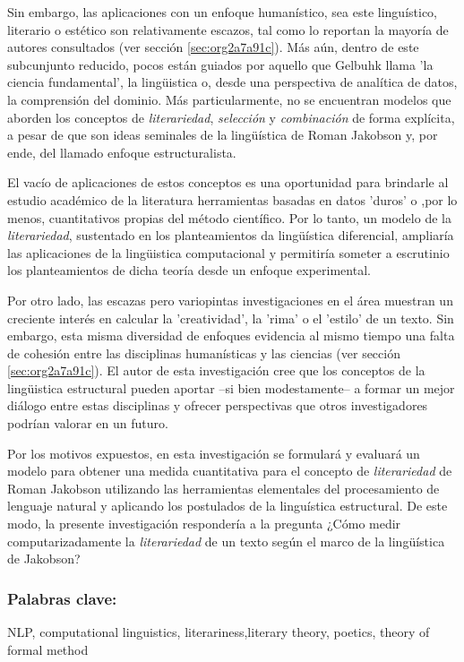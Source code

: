 \documentclass[12pt,letterpaper,twoside]{article}
\begin{document}
Sin embargo, las aplicaciones con un enfoque humanístico, sea este
linguístico, literario o estético son relativamente escazos, tal como
lo reportan la mayoría de autores consultados (ver sección \ref{sec:org2a7a91c}).  Más aún, dentro de este subcunjunto reducido, pocos
están guiados por aquello que Gelbuhk llama 'la ciencia fundamental',
la lingüistica o, desde una perspectiva de analítica de datos, la
comprensión del dominio. Más particularmente, no se encuentran modelos
que aborden los conceptos de \emph{literariedad}, \emph{selección} y \emph{combinación}
de forma explícita, a pesar de que son ideas seminales de la lingüística
de Roman Jakobson y, por ende, del llamado enfoque estructuralista.

El vacío de aplicaciones de estos conceptos es una oportunidad para
brindarle al estudio académico de la literatura herramientas basadas
en datos 'duros' o ,por lo menos, cuantitativos propias del método
científico. Por lo tanto, un modelo de la \emph{literariedad}, sustentado
en los planteamientos da lingüística diferencial, ampliaría las
aplicaciones de la lingüistica computacional y permitiría someter a
escrutinio los planteamientos de dicha teoría desde un enfoque
experimental.

Por otro lado, las escazas pero variopintas investigaciones en el área
muestran un creciente interés en calcular la 'creatividad', la 'rima'
o el 'estilo' de un texto. Sin embargo, esta misma diversidad de
enfoques evidencia al mismo tiempo una falta de cohesión entre las
disciplinas humanísticas y las ciencias (ver sección \ref{sec:org2a7a91c}). El autor de esta investigación cree que los conceptos de
la lingüistica estructural pueden aportar --si bien modestamente-- a
formar un mejor diálogo entre estas disciplinas y ofrecer perspectivas
que otros investigadores podrían valorar en un futuro.

Por los motivos expuestos, en esta investigación se formulará y
evaluará un modelo para obtener una medida cuantitativa para el
concepto de \emph{literariedad} de Roman Jakobson utilizando las
herramientas elementales del procesamiento de lenguaje natural y
aplicando los postulados de la linguística estructural. De este modo,
la presente investigación respondería a la pregunta ¿Cómo medir
computarizadamente la \emph{literariedad} de un texto según el marco de la
lingüística de Jakobson?

\subsubsection{\textbf{Palabras clave:}}
\label{sec:orga404480}
NLP, computational linguistics, literariness,literary theory, poetics, theory of formal method
\end{document}
